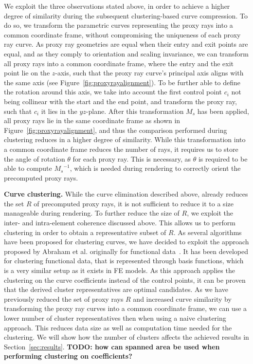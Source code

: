\documentclass[review,journal]{vgtc}         %
\begin{document}
We exploit the three observations stated above, in order to achieve a higher degree of similarity during the subsequent clustering-based curve compression. To do so, we transform the parametric curves representing the proxy rays into a common coordinate frame, without compromising the uniqueness of each proxy ray curve. As proxy ray geometries are equal when their entry and exit points are equal, and as they comply to orientation and scaling invariance, we can transform all proxy rays into a common coordinate frame, where the entry and the exit point lie on the $z$-axis, such that the proxy ray curve's principal axis aligns with the same axis (see Figure~\ref{fig:proxyrayalignment}). To be further able to define the rotation around this axis, we take into account the first control point $c_i$ not being collinear with the start and the end point, and transform the proxy ray, such that $c_i$ it lies in the $yz$-plane. After this transformation $M_s$ has been applied, all proxy rays lie in the same coordinate frame as shown in Figure~\ref{fig:proxyrayalignment}, and thus the comparison performed during clustering reduces in a higher degree of similarity. While this transformation into a common coordinate frame reduces the number of rays, it requires us to store the angle of rotation $\theta$ for each proxy ray. This is necessary, as $\theta$ is required to be able to compute ${M_s}^{-1}$, which is needed during rendering to correctly orient the precomputed proxy rays.


\noindent \textbf{Curve clustering.} While the curve elimination described above, already reduces the set $R$ of precomputed proxy rays, it is not sufficient to reduce it to a size manageable during rendering. To further reduce the size of $R$, we exploit the inter- and intra-element coherence discussed above. This allows us to perform clustering in order to obtain a representative subset of $R$. As several algorithms have been proposed for clustering curves, we have decided to exploit the approach proposed by Abraham et al. originally for functional data~\cite{abraham03clustering}. It has been developed for clustering functional data, that is represented through basis functions, which is a very similar setup as it exists in FE models. As this approach applies the clustering on the curve coefficients instead of the control points, it can be proven that the derived cluster representatives are optimal candidates. As we have previously reduced the set of proxy rays $R$ and increased curve similarity by transforming the proxy ray curves into a common coordinate frame, we can use a lower number of cluster representatives then when using a naive clustering approach. This reduces data size as well as computation time needed for the clustering. We will show how the number of clusters affects the achieved results in Section~\ref{sec:results}. \textbf{TODO: how can spanned area be used when performing clustering on coefficients?}
\end{document}
